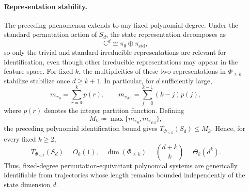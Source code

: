 \documentclass[11pt]{article}
\theoremstyle{plain}
\theoremstyle{definition}
\newtheorem{example}[theorem]{Example}
\theoremstyle{remark}
\begin{document}
 
\paragraph{Representation stability.}
The preceding phenomenon extends to any fixed polynomial degree. Under the
standard permutation action of \(S_d\), the state representation decomposes as
\[
\mathbb C^d\cong\pi_0\oplus\pi_{\mathrm{std}},
\]
so only the trivial and standard irreducible representations are relevant for
identification, even though other irreducible representations may appear in the
feature space. For fixed \(k\), the multiplicities of these two representations
in \(\Phi_{\le k}\) stabilize  stabilize once \(d\ge k+1\).   In particular, for \(d\)
sufficiently large,
\[
m_{\pi_0}=\sum_{r=0}^{k}p(r),\qquad
m_{\pi_{\mathrm{std}}}
=\sum_{j=0}^{k-1}(k-j)p(j),
\]
where \(p(r)\) denotes the integer partition function.
Defining
\[
M_k\coloneqq
\max\{m_{\pi_0},m_{\pi_{\mathrm{std}}}\},
\]
the preceding polynomial identification bound gives
\(T_{\Phi_{\le k}}(S_d)\le M_k\). Hence, for every fixed \(k \ge 2\),
\[
T_{\Phi_{\le k}}(S_d)=O_k(1),
\quad
\dim(\Phi_{\le k})=\binom{d+k}{k}=\Theta_k(d^k).
\]
Thus, fixed-degree permutation-equivariant polynomial systems are generically
identifiable from trajectories whose length remains bounded independently of
the state dimension \(d\).

 



 
\end{document}
